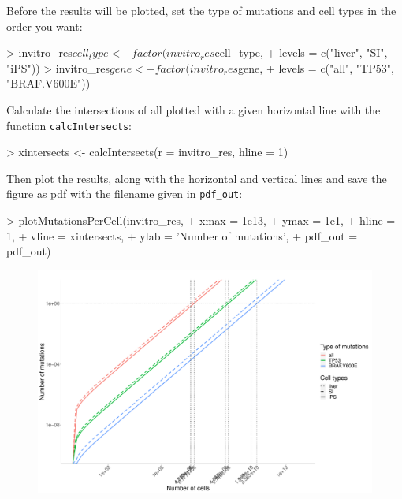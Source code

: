 \documentclass{article}
\begin{document}
Before the results will be plotted, set the type of mutations and cell types in
the order you want:

\begin{Schunk}
\begin{Sinput}
> invitro_res$cell_type <- factor(invitro_res$cell_type, 
+                                 levels = c("liver", "SI", "iPS"))
> invitro_res$gene <- factor(invitro_res$gene, 
+                            levels = c("all", "TP53", "BRAF.V600E"))
\end{Sinput}
\end{Schunk}

Calculate the intersections of all plotted with a given horizontal line with
the function \texttt{calcIntersects}:

\begin{Schunk}
\begin{Sinput}
> xintersects <- calcIntersects(r = invitro_res, hline = 1)
\end{Sinput}
\end{Schunk}

Then plot the results, along with the horizontal and vertical lines and save
the figure as pdf with the filename given in \texttt{pdf\_out}:

\begin{Schunk}
\begin{Sinput}
> plotMutationsPerCell(invitro_res, 
+                      xmax = 1e13,
+                      ymax = 1e1,
+                      hline = 1,
+                      vline = xintersects,
+                      ylab = 'Number of mutations',
+                      pdf_out = pdf_out)
\end{Sinput}
\end{Schunk}


\begin{figure}[H]
\begin{center}
\includegraphics[width=1.0\textwidth]{All_types}
\end{center}
\end{figure}
\end{document}
